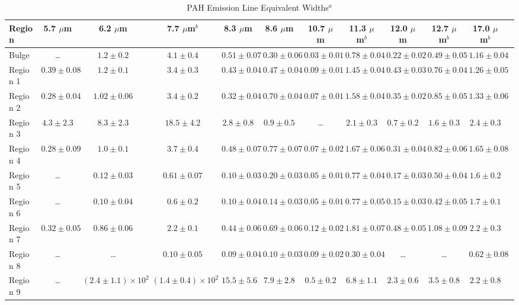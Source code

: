 \documentclass[useAMS,usenatbib,a4paper]{mn2e}
\begin{document}
\begin{table}
 \centering
 \begin{minipage}{200mm}
 
\caption{PAH Emission Line Equivalent Widths$^a$}
 {\scriptsize
  \begin{tabular}{l c c  c  c  c  c  c  c  c  c c }
  \hline 
     {Region }&{5.7 $\mu$m  }&{6.2 $\mu$m  }&{7.7 $\mu$m$^b$  }&{8.3 $\mu$m  }&{8.6 $\mu$m  }&{10.7 $\mu$m  }&{11.3 $\mu$m$^b$  }&{12.0 $\mu$m  }&{12.7 $\mu$m$^b$  }&{17.0 $\mu$m$^b$  } \\
 \hline
       Bulge  & \dots & $1.2 \pm 0.2$ & $4.1 \pm 0.4$ & $0.51 \pm 0.07$ & $0.30 \pm 0.06$ & $0.03 \pm 0.01$ & $0.78 \pm 0.04$ & $0.22 \pm 0.02$ & $0.49 \pm 0.05$ & $1.16 \pm 0.04$\\
    Region 1  & $0.39 \pm 0.08$ & $1.2 \pm 0.1$ & $3.4 \pm 0.3$ & $0.43 \pm 0.04$ & $0.47 \pm 0.04$ & $0.09 \pm 0.01$ & $1.45 \pm 0.04$ & $0.43 \pm 0.03$ & $0.76 \pm 0.04$ & $1.26 \pm 0.05$\\
    Region 2  & $0.28 \pm 0.04$ & $1.02 \pm 0.06$ & $3.4 \pm 0.2$ & $0.32 \pm 0.04$ & $0.70 \pm 0.04$ & $0.07 \pm 0.01$ & $1.58 \pm 0.04$ & $0.35 \pm 0.02$ & $0.85 \pm 0.05$ & $1.33 \pm 0.06$\\
    Region 3  & $4.3 \pm 2.3$ & $8.3 \pm 2.3$ & $18.5 \pm 4.2$ & $2.8 \pm 0.8$ & $0.9 \pm 0.5$ & \dots & $2.1 \pm 0.3$ & $0.7 \pm 0.2$ & $1.6 \pm 0.3$ & $2.4 \pm 0.3$\\
    Region 4  & $0.28 \pm 0.09$ & $1.0 \pm 0.1$ & $3.7 \pm 0.4$ & $0.48 \pm 0.07$ & $0.77 \pm 0.07$ & $0.07 \pm 0.02$ & $1.67 \pm 0.06$ & $0.31 \pm 0.04$ & $0.82 \pm 0.06$ & $1.65 \pm 0.08$\\
    Region 5  & \dots & $0.12 \pm 0.03$ & $0.61 \pm 0.07$ & $0.10 \pm 0.03$ & $0.20 \pm 0.03$ & $0.05 \pm 0.01$ & $0.77 \pm 0.04$ & $0.17 \pm 0.03$ & $0.50 \pm 0.04$ & $1.6 \pm 0.2$\\
    Region 6  & \dots & $0.10 \pm 0.04$ & $0.6 \pm 0.2$ & $0.10 \pm 0.04$ & $0.14 \pm 0.03$ & $0.05 \pm 0.01$ & $0.77 \pm 0.05$ & $0.15 \pm 0.03$ & $0.42 \pm 0.05$ & $1.7 \pm 0.1$\\
    Region 7  & $0.32 \pm 0.05$ & $0.86 \pm 0.06$ & $2.2 \pm 0.1$ & $0.44 \pm 0.06$ & $0.69 \pm 0.06$ & $0.12 \pm 0.02$ & $1.81 \pm 0.07$ & $0.48 \pm 0.05$ & $1.08 \pm 0.09$ & $2.2 \pm 0.3$\\
    Region 8  & \dots & \dots & $0.10 \pm 0.05$ & $0.09 \pm 0.04$ & $0.10 \pm 0.03$ & $0.09 \pm 0.02$ & $0.30 \pm 0.04$ & \dots & \dots & $0.62 \pm 0.08$\\
    Region 9  & \dots & $\left(2.4 \pm 1.1\right) \times 10^{2}$ & $\left(1.4 \pm 0.4\right) \times 10^{2}$ & $15.5 \pm 5.6$ & $7.9 \pm 2.8$ & $0.5 \pm 0.2$ & $6.8 \pm 1.1$ & $2.3 \pm 0.6$ & $3.5 \pm 0.8$ & $2.2 \pm 0.8$\\


\end{tabular}}
\end{minipage}
\end{table}
\end{document}

